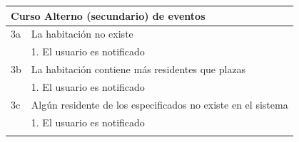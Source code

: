 \begin{table}[hp!]
{\begin{tabular}{|l|l|l|l|}
        \hline
        \multicolumn{4}{|l|}{{\cellcolor[rgb]{0.886,0.886,0.886}}\textbf{Curso Alterno (secundario) de eventos}}                                                                                                                                                                                              \\ 
        \hline
        3a & \multicolumn{3}{l|}{La habitación no existe}                                                                                                                                                                                                                                                     \\ 
        \hline
        & \multicolumn{3}{l|}{1. El usuario es notificado}                                                                                                                                                                                                                                                 \\ 
        \hline
        3b & \multicolumn{3}{l|}{La habitación contiene más residentes que plazas}                                                                                                                                                                                                                            \\ 
        \hline
        & \multicolumn{3}{l|}{1. El usuario es notificado}                                                                                                                                                                                                                                                 \\ 
        \hline
        3c & \multicolumn{3}{l|}{Algún residente de los especificados no existe en el sistema}                                                                                                                                                                                                                \\ 
        \hline
        & \multicolumn{3}{l|}{1. El usuario es notificado}                                                                                                                                                                                                                                                 \\ 
        \hline
        \multicolumn{4}{l}{}                                                                                                                                                                                                                                                                                  \\ 

\end{tabular}}
\end{table}
